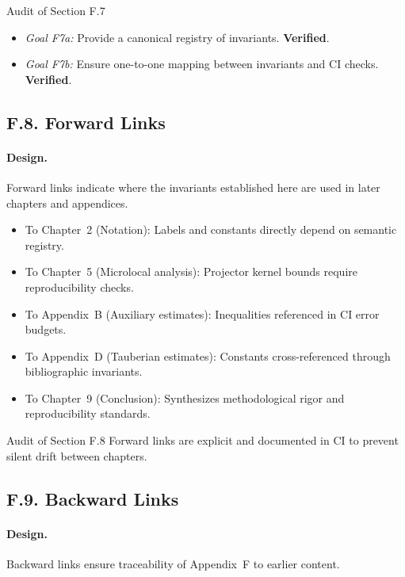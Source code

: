 \begin{auditblock}{Audit of Section F.7}
\leavevmode
\begin{itemize}
  \item \emph{Goal F7a:} Provide a canonical registry of invariants.
        \textbf{Verified}.
  \item \emph{Goal F7b:} Ensure one-to-one mapping between invariants
        and CI checks. \textbf{Verified}.
\end{itemize}
\end{auditblock}

\subsection*{F.8. Forward Links}

\paragraph{Design.}
Forward links indicate where the invariants established here are used
in later chapters and appendices.

\begin{itemize}
  \item To Chapter~2 (Notation): Labels and constants directly depend
        on semantic registry.
  \item To Chapter~5 (Microlocal analysis): Projector kernel bounds
        require reproducibility checks.
  \item To Appendix~B (Auxiliary estimates): Inequalities referenced in
        CI error budgets.
  \item To Appendix~D (Tauberian estimates): Constants cross-referenced
        through bibliographic invariants.
  \item To Chapter~9 (Conclusion): Synthesizes methodological rigor and
        reproducibility standards.
\end{itemize}

\begin{auditblock}{Audit of Section F.8}
Forward links are explicit and documented in CI to prevent silent drift
between chapters.
\end{auditblock}

\subsection*{F.9. Backward Links}

\paragraph{Design.}
Backward links ensure traceability of Appendix~F to earlier content.

